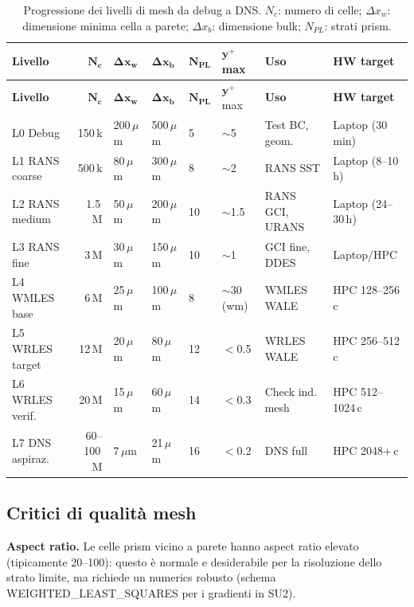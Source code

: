 \documentclass[11pt,a4paper]{article}
\begin{document}
\begin{longtable}{p{1.8cm}rp{1.2cm}p{1.2cm}p{1.2cm}p{1.3cm}p{2.0cm}p{2.0cm}}
  \caption{Progressione dei livelli di mesh da debug a DNS. $N_c$: numero di celle; $\Delta x_w$: dimensione minima cella a parete; $\Delta x_b$: dimensione bulk; $N_{PL}$: strati prism.}
  \label{tab:mesh} \\
  \toprule
  \rowcolor{tablehead}
  \textbf{Livello} & $\mathbf{N_c}$ & $\mathbf{\Delta x_w}$ & $\mathbf{\Delta x_b}$ & $\mathbf{N_{PL}}$ & $\mathbf{y^+}$ max & \textbf{Uso} & \textbf{HW target} \\
  \midrule
  \endfirsthead
  \toprule
  \rowcolor{tablehead}
  \textbf{Livello} & $\mathbf{N_c}$ & $\mathbf{\Delta x_w}$ & $\mathbf{\Delta x_b}$ & $\mathbf{N_{PL}}$ & $\mathbf{y^+}$ max & \textbf{Uso} & \textbf{HW target} \\
  \midrule
  \endhead
  \bottomrule
  \endfoot
  L0 Debug & 150\,k & 200\,$\mu$m & 500\,$\mu$m & 5 & $\sim$5 & Test BC, geom. & Laptop (30\,min) \\
  L1 RANS coarse & 500\,k & 80\,$\mu$m & 300\,$\mu$m & 8 & $\sim$2 & RANS SST & Laptop (8--10\,h) \\
  L2 RANS medium & 1.5\,M & 50\,$\mu$m & 200\,$\mu$m & 10 & $\sim$1.5 & RANS GCI, URANS & Laptop (24--30\,h) \\
  L3 RANS fine & 3\,M & 30\,$\mu$m & 150\,$\mu$m & 10 & $\sim$1 & GCI fine, DDES & Laptop/HPC \\
  L4 WMLES base & 6\,M & 25\,$\mu$m & 100\,$\mu$m & 8 & $\sim$30 (wm) & WMLES WALE & HPC 128--256\,c \\
  L5 WRLES target & 12\,M & 20\,$\mu$m & 80\,$\mu$m & 12 & $<$0.5 & WRLES WALE & HPC 256--512\,c \\
  L6 WRLES verif. & 20\,M & 15\,$\mu$m & 60\,$\mu$m & 14 & $<$0.3 & Check ind. mesh & HPC 512--1024\,c \\
  L7 DNS aspiraz. & 60--100\,M & 7\,$\mu$m & 21\,$\mu$m & 16 & $<$0.2 & DNS full & HPC 2048+\,c \\
\end{longtable}

\subsection{Critici di qualità mesh}

\textbf{Aspect ratio.} Le celle prism vicino a parete hanno aspect ratio elevato (tipicamente 20--100): questo è normale e desiderabile per la risoluzione dello strato limite, ma richiede un numerics robusto (schema WEIGHTED\_LEAST\_SQUARES per i gradienti in SU2).
\end{document}
